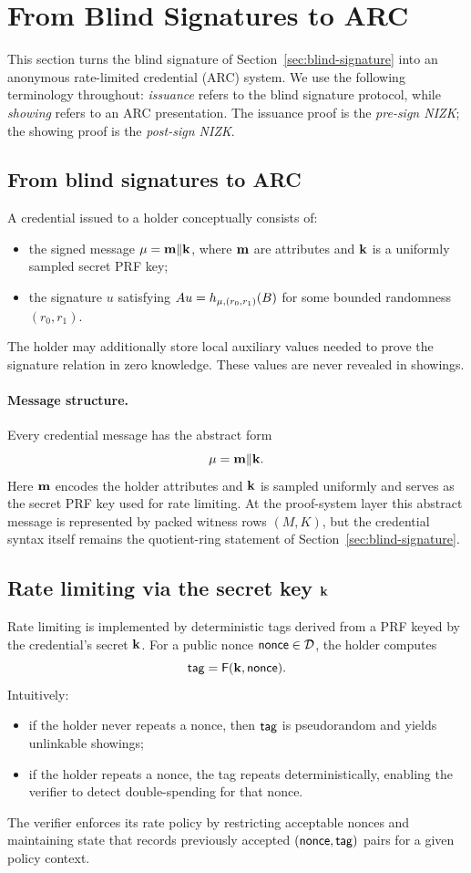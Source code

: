 \section{From Blind Signatures to ARC}
\label{sec:arc-construction}

This section turns the blind signature of Section~\ref{sec:blind-signature} into an anonymous rate-limited credential
(ARC) system. We use the following terminology throughout:
\emph{issuance} refers to the blind signature protocol, while \emph{showing} refers to an ARC presentation.
The issuance proof is the \emph{pre-sign NIZK}; the showing proof is the \emph{post-sign NIZK}.

\subsection{From blind signatures to ARC}
A credential issued to a holder conceptually consists of:
\begin{itemize}[leftmargin=1.25em]
  \item the signed message \(\mathbf{\mu}=\mathbf{m}\Vert \mathbf{k}\), where \(\mathbf{m}\) are attributes and \(\mathbf{k}\) is a uniformly sampled secret PRF key;
  \item the signature \(u\) satisfying \(A u = h_{\mathbf{\mu},(r_0,r_1)}(B)\) for some bounded randomness \((r_0,r_1)\).
\end{itemize}
The holder may additionally store local auxiliary values needed to prove the signature relation in zero knowledge. These
values are never revealed in showings.

\paragraph{Message structure.}
Every credential message has the abstract form
\[
  \mathbf{\mu} = \mathbf{m} \Vert \mathbf{k}.
\]
Here \(\mathbf{m}\) encodes the holder attributes and \(\mathbf{k}\) is sampled uniformly and serves as the secret PRF key used for
rate limiting. At the proof-system layer this abstract message is represented by packed witness rows \((M,K)\), but the
credential syntax itself remains the quotient-ring statement of Section~\ref{sec:blind-signature}.

\subsection{Rate limiting via the secret key \(\mathbf{k}\)}
Rate limiting is implemented by deterministic tags derived from a PRF keyed by the credential's secret \(\mathbf{k}\). For a
public nonce \(\mathsf{nonce}\in\mathcal{D}\), the holder computes
\[
  \mathsf{tag} = \mathsf{F}(\mathbf{k},\mathsf{nonce}).
\]
Intuitively:
\begin{itemize}[leftmargin=1.25em]
  \item if the holder never repeats a nonce, then \(\mathsf{tag}\) is pseudorandom and yields unlinkable showings;
  \item if the holder repeats a nonce, the tag repeats deterministically, enabling the verifier to detect double-spending
  for that nonce.
\end{itemize}
The verifier enforces its rate policy by restricting acceptable nonces and maintaining state that records previously
accepted \((\mathsf{nonce},\mathsf{tag})\) pairs for a given policy context.


